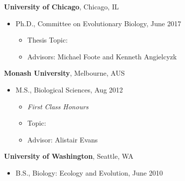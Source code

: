 \documentclass[10pt]{article}
\renewcommand{\section}[1]{\pagebreak[3]%
    \hyphenpenalty=10000%
    \vspace{1.3\baselineskip}%
    \phantomsection\addcontentsline{toc}{section}{#1}%
    \noindent\llap{\scshape\smash{\parbox[t]{\marginparwidth}{\raggedright #1}}}%
    \vspace{-\baselineskip}\par}
\newenvironment{outerlist}[1][\enskip\textbullet]%
        {\begin{itemize}[#1,leftmargin=*]}{\end{itemize}%
            \vspace{-.6\baselineskip}}
\newenvironment{innerlist}[1][\enskip\textbullet]%
        {\begin{itemize}[#1,leftmargin=*,parsep=0pt,itemsep=0pt,topsep=0pt,partopsep=0pt]}
        {\end{itemize}}
\begin{document}
\textbf{University of Chicago}, Chicago, IL
\begin{outerlist}
\item[] Ph.D., Committee on Evolutionary Biology, June 2017
  \begin{innerlist}
  \item Thesis Topic: \emph{ }
  \item Advisors: Michael Foote and Kenneth Angielcyzk
  \end{innerlist}
\end{outerlist}
\vspace{.1in}
\textbf{Monash University}, Melbourne, AUS 
\begin{outerlist}
\item[] M.S., Biological Sciences, Aug 2012
  \begin{innerlist}
  \item \emph{First Class Honours}
  \item Topic: \emph{ }
  \item Advisor: Alistair Evans
  \end{innerlist}
\end{outerlist}
\vspace{.1in}
\textbf{University of Washington}, Seattle, WA
\begin{outerlist}
\item[] B.S., Biology: Ecology and Evolution, June 2010
\end{outerlist}

%
%
%
%
\end{document}
